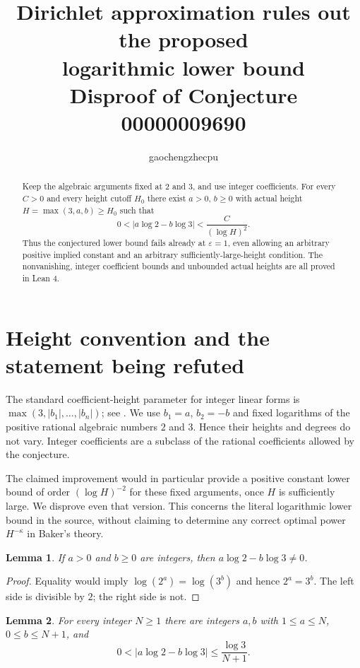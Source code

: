 \documentclass[11pt]{article}
\title{Dirichlet approximation rules out the proposed\\logarithmic lower bound\\
\large Disproof of Conjecture 00000009690}
\author{gaochengzhecpu}\date{}
\newtheorem{lemma}{Lemma}
\begin{document}
\maketitle
\begin{abstract}
Keep the algebraic arguments fixed at $2$ and $3$, and use integer
coefficients. For every $C>0$ and every height cutoff $H_0$ there
exist $a>0$, $b\geq0$ with actual height $H=\max(3,a,b)\geq H_0$
such that
\[
 0<|a\log2-b\log3|<\frac{C}{(\log H)^2}.
\]
Thus the conjectured lower bound fails already at $\varepsilon=1$,
even allowing an arbitrary positive implied constant and an
arbitrary sufficiently-large-height condition. The nonvanishing,
integer coefficient bounds and unbounded actual heights are all
proved in Lean 4.
\end{abstract}

\section*{Height convention and the statement being refuted}
The standard coefficient-height parameter for integer linear
forms is $\max(3,|b_1|,\ldots,|b_n|)$; see \cite[abstract]{bugeaud}.
We use $b_1=a$, $b_2=-b$ and fixed logarithms of the positive
rational algebraic numbers $2$ and $3$. Hence their heights and
degrees do not vary. Integer coefficients are a subclass of the
rational coefficients allowed by the conjecture.

The claimed improvement would in particular provide a positive
constant lower bound of order $(\log H)^{-2}$ for these fixed
arguments, once $H$ is sufficiently large. We disprove even
that version. This concerns the literal logarithmic lower bound
in the source, without claiming to determine any correct optimal
power $H^{-\kappa}$ in Baker's theory.

\begin{lemma}\label{lem:nonzero}
If $a>0$ and $b\geq0$ are integers, then
$a\log2-b\log3\ne0$.
\end{lemma}
\begin{proof}
Equality would imply $\log(2^a)=\log(3^b)$ and hence $2^a=3^b$.
The left side is divisible by $2$; the right side is not.
\end{proof}

\begin{lemma}\label{lem:approx}
For every integer $N\geq1$ there are integers $a,b$ with
$1\leq a\leq N$, $0\leq b\leq N+1$, and
\[
 0<|a\log2-b\log3|\leq\frac{\log3}{N+1}.
\]
\end{lemma}
\end{document}
